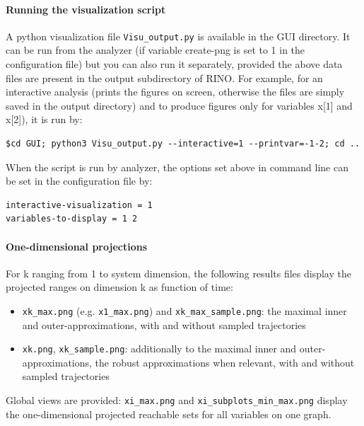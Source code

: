 \documentclass{article}
\begin{document}
\paragraph{Running the visualization script}
A python visualization file \texttt{Visu\_output.py} is available in the GUI directory. It can be run from the analyzer (if variable create-png is set to 1 in the configuration file) but you can also run it separately,  provided the above data files are present in the output subdirectory of RINO. 
For example, for an interactive analysis (prints the figures on screen, otherwise the files are simply saved in the output directory) and to produce figures only for variables x[1] and x[2]),  it is run by:
\begin{verbatim}
$cd GUI; python3 Visu_output.py --interactive=1 --printvar=-1-2; cd ..
\end{verbatim}
When the script is run by analyzer, the options set above in command line can be set in the configuration file by: 
\begin{verbatim}
interactive-visualization = 1
variables-to-display = 1 2
\end{verbatim}
\paragraph{One-dimensional projections}
For k ranging from 1 to system dimension, the following results files display the projected ranges on dimension k as function of time:
\begin{itemize}[noitemsep]
\item \texttt{xk\_max.png}  (e.g.  \texttt{x1\_max.png})  and \texttt{xk\_max\_sample.png}: the maximal inner and outer-approximations, with and without sampled trajectories
\item \texttt{xk.png},  \texttt{xk\_sample.png}: additionally to the maximal inner and outer-approximations, the robust approximations when relevant, with and without sampled trajectories
\end{itemize}
Global views are provided: \texttt{xi\_max.png} and \texttt{xi\_subplots\_min\_max.png} display the one-dimensional projected reachable sets for all variables on one graph. 
\end{document}

